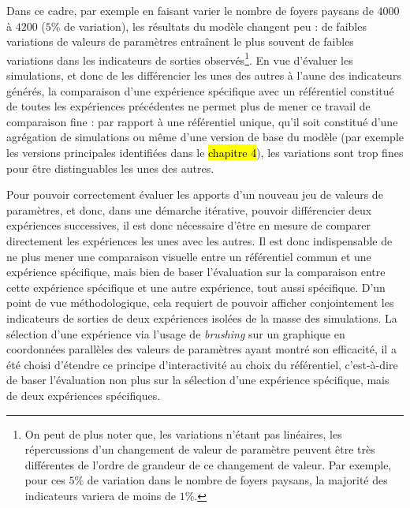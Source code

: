 	Dans ce cadre, par exemple en faisant varier le nombre de foyers paysans de $4000$ à $4200$ ($5\%$ de variation), les résultats du modèle changent peu :  de faibles variations de valeurs de paramètres entraînent le plus souvent de faibles variations dans les indicateurs de sorties observés\footnote{
	On peut de plus noter que, les variations n'étant pas linéaires, les répercussions d'un changement de valeur de paramètre peuvent être très différentes de l'ordre de grandeur de ce changement de valeur. Par exemple, pour ces $5\%$ de variation dans le nombre de foyers paysans, la majorité des indicateurs variera de moins de $1\%$.
	}.
	En vue d'évaluer les simulations, et donc de les différencier les unes des autres à l'aune des indicateurs générés, la comparaison d'une expérience spécifique avec un référentiel constitué de toutes les expériences précédentes ne permet plus de mener ce travail de comparaison fine : par rapport à une référentiel unique, qu'il soit constitué d'une agrégation de simulations ou même d'une version \og de base\fg{} du modèle (par exemple les versions principales identifiées dans le \hl{chapitre 4}), les variations sont trop fines pour être distinguables les unes des autres.

	Pour pouvoir correctement évaluer les apports d'un nouveau jeu de valeurs de paramètres, et donc, dans une démarche itérative, pouvoir différencier deux expériences successives, il est donc nécessaire d'être en mesure de comparer directement les expériences les unes avec les autres.
	Il est donc indispensable de ne plus mener une comparaison visuelle entre un référentiel commun et une expérience spécifique, mais bien de baser l'évaluation sur la comparaison entre cette expérience spécifique et une autre expérience, tout aussi spécifique.
	D'un point de vue méthodologique, cela requiert de pouvoir afficher conjointement les indicateurs de sorties de deux expériences isolées de la masse des simulations.
	La sélection d'une expérience via l'usage de \textit{brushing} sur un graphique en coordonnées parallèles des valeurs de paramètres ayant montré son efficacité, il a été choisi d'étendre ce principe d'interactivité au choix du référentiel, c'est-à-dire de baser l'évaluation non plus sur la sélection d'une expérience spécifique, mais de deux expériences spécifiques.

